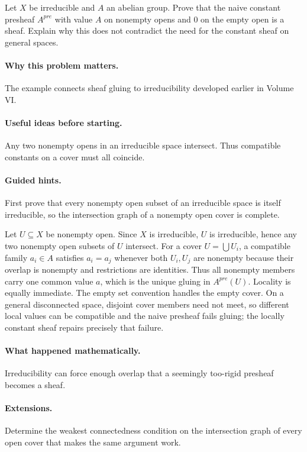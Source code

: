 \begin{problem}
Let $X$ be irreducible and $A$ an abelian group. Prove that the naive constant presheaf $A^{pre}$ with value $A$ on nonempty opens and $0$ on the empty open is a sheaf. Explain why this does not contradict the need for the constant sheaf on general spaces.
\end{problem}

\paragraph{Why this problem matters.}
The example connects sheaf gluing to irreducibility developed earlier in Volume VI.

\paragraph{Useful ideas before starting.}
Any two nonempty opens in an irreducible space intersect. Thus compatible constants on a cover must all coincide.

\paragraph{Guided hints.}
First prove that every nonempty open subset of an irreducible space is itself irreducible, so the intersection graph of a nonempty open cover is complete.

\ifdefined\FullProblemDossiers
\begin{solution}
Let $U\subseteq X$ be nonempty open. Since $X$ is irreducible, $U$ is irreducible, hence any two nonempty open subsets of $U$ intersect. For a cover $U=\bigcup U_i$, a compatible family $a_i\in A$ satisfies $a_i=a_j$ whenever both $U_i,U_j$ are nonempty because their overlap is nonempty and restrictions are identities. Thus all nonempty members carry one common value $a$, which is the unique gluing in $A^{pre}(U)$. Locality is equally immediate. The empty set convention handles the empty cover. On a general disconnected space, disjoint cover members need not meet, so different local values can be compatible and the naive presheaf fails gluing; the locally constant sheaf repairs precisely that failure.
\end{solution}

\paragraph{What happened mathematically.}
Irreducibility can force enough overlap that a seemingly too-rigid presheaf becomes a sheaf.

\paragraph{Extensions.}
Determine the weakest connectedness condition on the intersection graph of every open cover that makes the same argument work.
\fi
